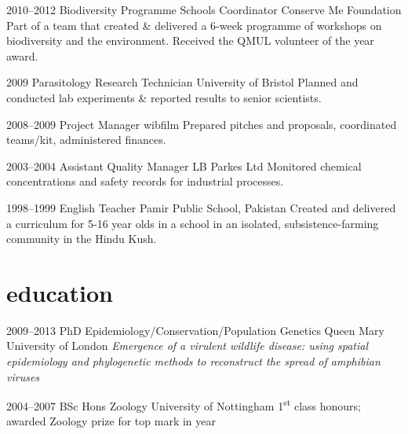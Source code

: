 \documentclass[]{friggeri-cv-a4}
\begin{document}
\begin{entrylist}

\entry
{2010--2012}
{Biodiversity Programme Schools Coordinator}
{Conserve Me Foundation}
{Part of a team that created \& delivered a 6-week programme of workshops on biodiversity and the environment. Received the QMUL volunteer of the year award.}


\entry
{2009}
{Parasitology Research Technician}
{University of Bristol}
{Planned and conducted lab experiments \& reported results to senior scientists.}


\entry
{2008--2009}
{Project Manager}
{wibfilm}
{Prepared pitches and proposals, coordinated teams/kit, administered finances.}


\entry
{2003--2004}
{Assistant Quality Manager}
{LB Parkes Ltd}
{Monitored chemical concentrations and safety records for industrial processes.}


\entry
{1998--1999}
{English Teacher}
{Pamir Public School, Pakistan}
{Created and delivered a curriculum for 5-16 year olds in a school in an isolated, subsistence-farming community in the Hindu Kush.}


\end{entrylist}


\section{education}

\begin{entrylist}


\entry
{2009--2013}
{PhD {\normalfont Epidemiology/Conservation/Population Genetics}}
{Queen Mary University of London}
{\emph{Emergence of a virulent wildlife disease: using spatial epidemiology and phylogenetic methods to reconstruct the spread of amphibian viruses}}


\entry
{2004--2007}
{BSc Hons Zoology}
{University of Nottingham}
{1\textsuperscript{st} class honours; awarded Zoology prize for top mark in year}


\end{entrylist}
\end{document}
